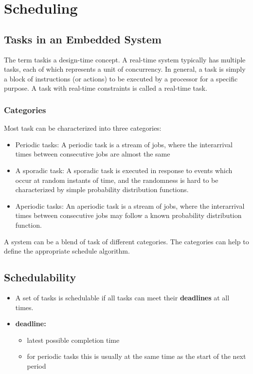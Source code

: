 \section{Scheduling}

\subsection{Tasks in an Embedded System}
The term \glqq task\grqq is a design-time concept.
A real-time system typically has multiple tasks, each of which represents a unit of concurrency.
In general, a task is simply a block of instructions (or actions) to be executed by a processor for a specific purpose.
A task with real-time constraints is called a real-time task.

\subsubsection{Categories}
Most task can be characterized into three categories:
\begin{itemize}
  \item Periodic tasks: A periodic task is a stream of jobs, where the interarrival times between consecutive jobs are almost the same
  \item A sporadic task: A sporadic task is executed in response to events which occur at random instants of time, and the randomness is hard to be characterized by simple probability distribution functions.
  \item Aperiodic tasks: An aperiodic task is a stream of jobs, where the interarrival times between consecutive jobs may follow a known probability distribution function.
\end{itemize}
A system can be a blend of task of different categories. The categories can help to define the appropriate schedule algorithm.

\subsection{Schedulability}
\begin{itemize}
  \item A set of tasks is schedulable if all tasks can meet their \textbf{deadlines} at all times.
  \item \textbf{deadline:}
        \begin{itemize}
          \item latest possible completion time
          \item for periodic tasks this is usually at the same time as the start of the next period
        \end{itemize}
\end{itemize}


